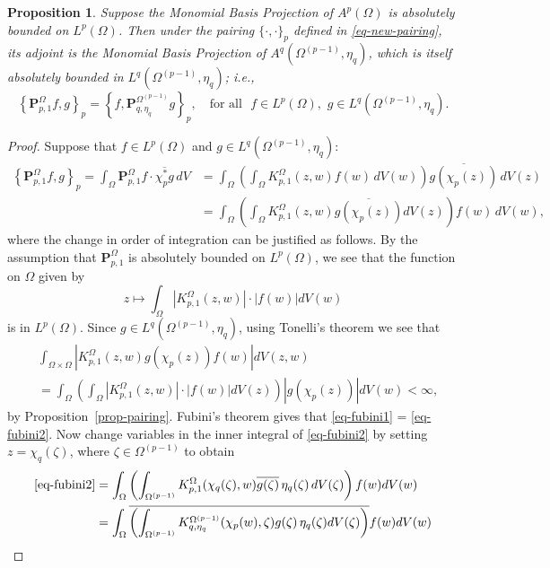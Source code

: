 \documentclass[letterpaper,11pt,reqno]{amsart}
\theoremstyle{plain}
\newtheorem{proposition}[equation]{Proposition}
\theoremstyle{definition}
\theoremstyle{remark}
\theoremstyle{remark}
\numberwithin{equation}{section}
\newcommand{\abs}[1]{\left\vert#1\right\vert}
\newcommand{\ol}{\overline}
\begin{document}
\begin{proposition}\label{prop-adjoint}
Suppose the Monomial Basis Projection of $A^p(\Omega)$ is absolutely bounded on $L^p(\Omega)$. 
Then under the pairing $\{\cdot,\cdot\}_p$ defined in \eqref{eq-new-pairing}, its adjoint is the Monomial Basis Projection of $A^q(\Omega^{(p-1)},\eta_q)$, which is itself absolutely bounded in $L^q(\Omega^{(p-1)},\eta_q)$; i.e.,
\[
\left\{\bm{P}^\Omega_{p,1}f,g\right\}_p = \left\{f, \bm{P}^{\Omega^{(p-1)}}_{q,\eta_q}g\right\}_p, \quad \text{for all } \,\,f \in L^p(\Omega), \,\, g \in L^q(\Omega^{(p-1)},\eta_q).
\]
\end{proposition}
\begin{proof}
Suppose that $f\in L^p(\Omega)$ and $g\in L^q(\Omega^{(p-1)}, \eta_q)$:
\begin{align}
\left\{\bm{P}^\Omega_{p,1}f,g\right\}_p
= \int_\Omega \bm{P}^\Omega_{p,1} f \cdot \ol{\chi_p^*g }\,dV 
&= \int_\Omega\left( \int_\Omega K^\Omega_{p,1}(z,w)f(w)\, dV(w) \right) \ol{g(\chi_p(z))}\, dV(z)\label{eq-fubini1} \\
&= \int_\Omega \left( \int_\Omega K^\Omega_{p,1}(z,w)\ol{g(\chi_p(z))} dV(z) \right) f(w)\, dV(w), \label{eq-fubini2}
\end{align}
where the change in order of integration can be justified as follows. 
By the assumption that $\bm{P}^\Omega_{p,1}$ is absolutely bounded on $L^p(\Omega)$, we see that the function on $\Omega$ given by
\[ 
z \longmapsto  \int_\Omega \abs{ K^\Omega_{p,1}(z,w)}\cdot \abs{f(w)}dV(w)  
\]
is in $L^p(\Omega)$.  Since $g\in  L^q(\Omega^{(p-1)}, \eta_q)$, using Tonelli's theorem we see that
\begin{align*}
&\int_{\Omega\times \Omega} \abs{K^\Omega_{p,1}(z,w)g(\chi_p(z)) f(w)} dV(z,w)\\
&=\int_\Omega \left( \int_\Omega\abs{K^\Omega_{p,1}(z,w)}\cdot \abs{f(w)}  dV(z) \right) \abs{g(\chi_p(z))} dV(w) <\infty,
\end{align*}
by Proposition~\ref{prop-pairing}.  
Fubini's theorem gives that \eqref{eq-fubini1} = \eqref{eq-fubini2}.   
Now change variables in the inner integral of \eqref{eq-fubini2} by setting $z = \chi_q(\zeta)$, where $\zeta \in \Omega^{(p-1)}$ to obtain 
\begin{align}
\eqref{eq-fubini2} 
&= \int_{\Omega}\left( \int_{\Omega^{(p-1)}} K^\Omega_{p,1}(\chi_q(\zeta),w)\ol{g(\zeta)}\,\eta_q(\zeta)\, dV(\zeta) \right) f(w) dV(w) \nonumber\\
&= \int_{\Omega} \ol{\left( \int_{\Omega^{(p-1)}} {K^{\Omega^{(p-1)}}_{q,\eta_q}(\chi_p(w), \zeta)} {g(\zeta)}\, \eta_q(\zeta)  dV(\zeta) \right)} f(w) dV(w) \label{eq-just1} \\

\end{align}
\end{proof}
\end{document}
